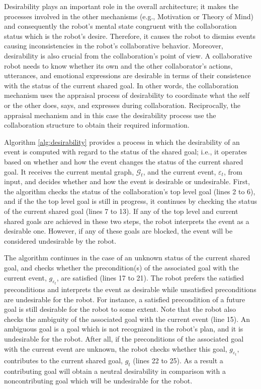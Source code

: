 \documentclass[letterpaper]{article}
\begin{document}
Desirability plays an important role in the overall architecture; it makes the
processes involved in the other mechanisms (e.g., Motivation or Theory of Mind)
and consequently the robot's mental state congruent with the collaboration
status which is the robot's desire. Therefore, it causes the robot to dismiss
events causing inconsistencies in the robot's collaborative behavior. Moreover,
desirability is also crucial from the collaboration's point of view. A
collaborative robot needs to know whether its own and the other collaborator's
actions, utterances, and emotional expressions are desirable in terms of their
consistence with the status of the current shared goal. In other words, the
collaboration mechanism uses the appraisal process of desirability to coordinate
what the self or the other does, says, and expresses during collaboration.
Reciprocally, the appraisal mechanism and in this case the desirability process
use the collaboration structure to obtain their required information.

Algorithm \ref{alg:desirability} provides a process in which the desirability of
an event is computed with regard to the status of the shared goal; i.e., it
operates based on whether and how the event changes the status of the current
shared goal. It receives the current mental graph, $\mathcal{G}_{t}$, and the
current event, $\varepsilon_t$, from input, and decides whether and how the
event is desirable or undesirable. First, the algorithm checks the status of the
collaboration's top level goal (lines 2 to 6), and if the the top level goal is
still in progress, it continues by checking the status of the current shared
goal (lines 7 to 13). If any of the top level and current shared goals are
achieved in these two steps, the robot interprets the event as a desirable one.
However, if any of these goals are blocked, the event will be considered
undesirable by the robot. 

The algorithm continues in the case of an unknown status of the current shared
goal, and checks whether the precondition(s) of the associated goal with the
current event, $\mathit{g}_{\varepsilon_t}$, are satisfied (lines 17 to 21).
The robot prefers the satisfied preconditions and interprets the event as
desirable while unsatisfied preconditions are undesirable for the robot. For
instance, a satisfied precondition of a future goal is still desirable for the
robot to some extent. Note that the robot also checks the ambiguity of the
associated goal with the current event (line 15). An ambiguous goal is a goal
which is not recognized in the robot's plan, and it is undesirable for the
robot. After all, if the preconditions of the associated goal with the current
event are unknown, the robot checks whether this goal,
$\mathit{g}_{\varepsilon_t}$, contributes to the current shared goal,
$\mathit{g}_{t}$ (lines 22 to 25). As a result a contributing goal will obtain a
neutral desirability in comparison with a noncontributing goal which will be
undesirable for the robot.
\end{document}
